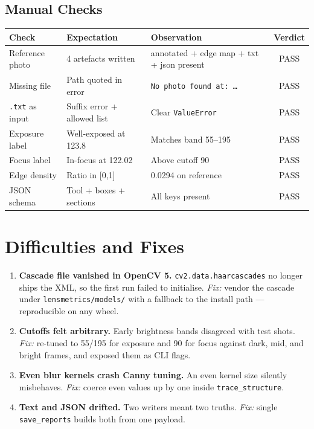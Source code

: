 \documentclass[11pt,a4paper]{article}
\begin{document}
\subsection{Manual Checks}
\begin{center}
\footnotesize
\begin{tabularx}{\textwidth}{p{3.2cm}p{4.4cm}Xc}
\toprule
\textbf{Check} & \textbf{Expectation} & \textbf{Observation} & \textbf{Verdict} \\
\midrule
Reference photo & 4 artefacts written & annotated + edge map + txt + json present & PASS \\
Missing file & Path quoted in error & \texttt{No photo found at: \dots} & PASS \\
\texttt{.txt} as input & Suffix error + allowed list & Clear \texttt{ValueError} & PASS \\
Exposure label & Well-exposed at 123.8 & Matches band 55--195 & PASS \\
Focus label & In-focus at 122.02 & Above cutoff 90 & PASS \\
Edge density & Ratio in [0,1] & 0.0294 on reference & PASS \\
JSON schema & Tool + boxes + sections & All keys present & PASS \\
\bottomrule
\end{tabularx}
\end{center}

\section{Difficulties and Fixes}
\begin{enumerate}[leftmargin=1.5em]
  \item \textbf{Cascade file vanished in OpenCV 5.} \texttt{cv2.data.haarcascades}
    no longer ships the XML, so the first run failed to initialise.
    \textit{Fix:} vendor the cascade under \texttt{lensmetrics/models/} with a
    fallback to the install path --- reproducible on any wheel.
  \item \textbf{Cutoffs felt arbitrary.} Early brightness bands disagreed with
    test shots. \textit{Fix:} re-tuned to 55/195 for exposure and 90 for focus
    against dark, mid, and bright frames, and exposed them as CLI flags.
  \item \textbf{Even blur kernels crash Canny tuning.} An even kernel size
    silently misbehaves. \textit{Fix:} coerce even values up by one inside
    \texttt{trace\_structure}.
  \item \textbf{Text and JSON drifted.} Two writers meant two truths.
    \textit{Fix:} single \texttt{save\_reports} builds both from one payload.
\end{enumerate}
\end{document}
